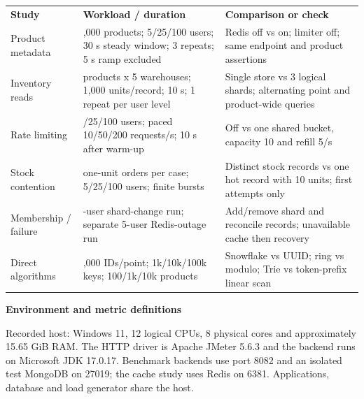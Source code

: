 \documentclass[11pt,a4paper]{article}
\newcommand{\ReportHeading}[1]{%
  \par\addvspace{4bp}%
  {\sffamily\bfseries\color{Navy}\fontsize{11.3bp}{15bp}\selectfont #1\par}%
  \nobreak\vspace{-2bp}}
\begin{document}
\noindent\begin{minipage}{\linewidth}
\setlength{\parskip}{0pt}
\label{tab:report-6}
\begingroup\sffamily\fontsize{9.1bp}{11.830bp}\selectfont
\setlength{\tabcolsep}{5bp}\setlength{\extrarowheight}{6bp}
\renewcommand{\arraystretch}{1.15}
\begin{tabular}{>{\RaggedRight\arraybackslash}p{}>{\RaggedRight\arraybackslash}p{}>{\RaggedRight\arraybackslash}p{}}
\rowcolor{Navy}
\color{white}\bfseries Study & \color{white}\bfseries Workload / duration & \color{white}\bfseries Comparison or check \\
Product metadata & 1,000 products; 5/25/100 users; 30 s steady window; 3 repeats; 5 s ramp excluded & Redis off vs on; limiter off; same endpoint and product assertions \\
Inventory reads & 100 products x 5 warehouses; 1,000 units/record; 10 s; 1 repeat per user level & Single store vs 3 logical shards; alternating point and product-wide queries \\
Rate limiting & 5/25/100 users; paced 10/50/200 requests/s; 10 s after warm-up & Off vs one shared bucket, capacity 10 and refill 5/s \\
Stock contention & 100 one-unit orders per case; 5/25/100 users; finite bursts & Distinct stock records vs one hot record with 10 units; first attempts only \\
Membership / failure & 25-user shard-change run; separate 5-user Redis-outage run & Add/remove shard and reconcile records; unavailable cache then recovery \\
Direct algorithms & 250,000 IDs/point; 1k/10k/100k keys; 100/1k/10k products & Snowflake vs UUID; ring vs modulo; Trie vs token-prefix linear scan \\
\end{tabular}
\endgroup
\end{minipage}\par

\ReportHeading{Environment and metric definitions}

Recorded host: Windows 11, 12 logical CPUs, 8 physical cores and approximately 15.65 GiB RAM. The HTTP driver is
Apache JMeter 5.6.3 and the backend runs on Microsoft JDK 17.0.17. Benchmark backends use port 8082 and an
isolated test MongoDB on 27019; the cache study uses Redis on 6381. Applications, database and load generator
share the host.
\end{document}

